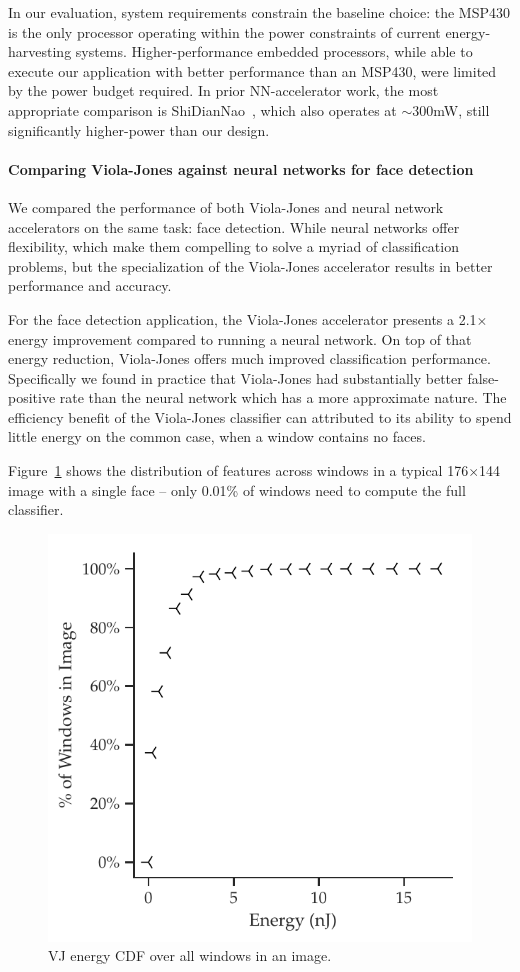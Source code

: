 In our evaluation, system requirements constrain the baseline choice: the MSP430 is the only processor operating within the power constraints of current energy-harvesting systems.
Higher-performance embedded processors, while able to execute our application with better performance than an MSP430, were limited by the power budget required.
In prior NN-accelerator work, the most appropriate comparison is ShiDianNao~\cite{shidiannao}, which also operates at $ \sim$300mW, still significantly higher-power than our design.

\paragraph{Comparing Viola-Jones against neural networks for face detection}
We compared the performance of both Viola-Jones and neural network accelerators
on the same task: face detection. While neural networks offer flexibility,
which make them compelling to solve a myriad of classification problems, but the
specialization of the Viola-Jones accelerator results in better performance and
accuracy.

For the face detection application, the Viola-Jones accelerator presents
a 2.1$\times$ energy improvement compared to running a neural network. On top of that energy reduction, Viola-Jones offers much improved classification performance.
Specifically we found in practice that Viola-Jones had substantially better
false-positive rate than the neural network which has a more approximate nature.
The efficiency benefit of the Viola-Jones classifier
can attributed to its ability to spend little energy on the common case, when a
window contains no faces.

Figure~\ref{fig:vj-cdf} shows the
distribution of features across windows in a typical 176$\times$144 image with a single face -- only 0.01\%
of windows need to compute the full classifier.

\begin{figure}[h]
\centering
      \includegraphics[width=.6\textwidth]{nsp-figs/eval_vj_cdf2.pdf}
\caption{VJ energy CDF over all windows in an image.}
\label{fig:vj-cdf}
\end{figure}


